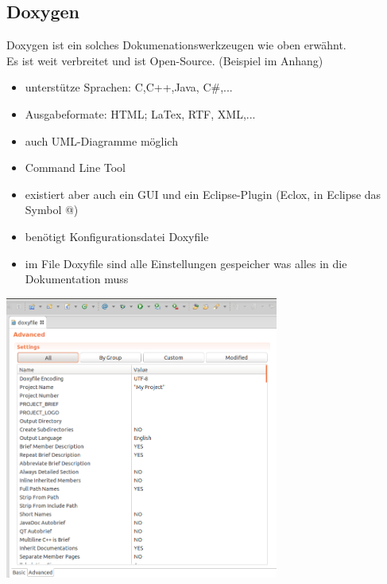 \subsection{Doxygen}
Doxygen ist ein solches Dokumenationswerkzeugen wie oben erwähnt.\\
Es ist weit verbreitet und ist Open-Source. (Beispiel im Anhang)
\begin{itemize}
	\item unterstütze Sprachen: C,C++,Java, C\#,...
	\item Ausgabeformate: HTML; LaTex, RTF, XML,...
	\item auch UML-Diagramme möglich
	\item Command Line Tool
	\item existiert aber auch ein GUI und ein Eclipse-Plugin (Eclox, in Eclipse das Symbol @)
	\item benötigt Konfigurationsdatei Doxyfile 
	\item im File Doxyfile sind alle Einstellungen gespeicher was alles in die Dokumentation muss
\end{itemize}
\includegraphics[width=9cm]{images/doxygen_advanced.png}
